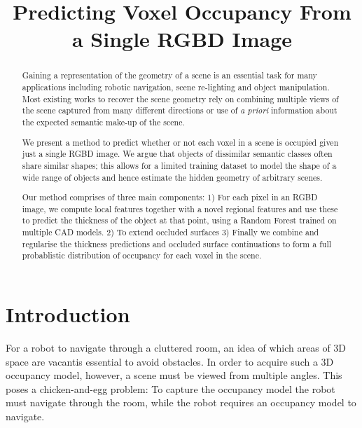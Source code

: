 \documentclass[10pt,twocolumn,letterpaper]{article}
\title{Predicting Voxel Occupancy From a Single RGBD Image}
\makeatletter
\renewcommand*{\eg}{e.g.\@\xspace}
\makeatother
\begin{document}
\maketitle

\begin{abstract}
	Gaining a representation of the geometry of a scene is an essential task for many applications including robotic navigation, scene re-lighting and object manipulation. 
	Most existing works to recover the scene geometry rely on combining multiple views of the scene captured from many different directions or use of \emph{a priori} information about the expected semantic make-up of the scene.

	We present a method to predict whether or not each voxel in a scene is occupied given just a single RGBD image.
	We argue that objects of dissimilar semantic classes often share similar shapes; this allows for a limited training dataset to model the shape of a wide range of objects and hence estimate the hidden geometry of arbitrary scenes.

	Our method comprises of three main components:
    1) For each pixel in an RGBD image, we compute local features together with a novel regional features and use these to predict the thickness of the object at that point, using a Random Forest trained on multiple CAD models.
    2) To extend occluded surfaces
    3) Finally we combine and regularise the thickness predictions and occluded surface continuations to form a full probablistic distribution of occupancy for each voxel in the scene.
\end{abstract}


\section{Introduction}

For a robot to navigate through a cluttered room, an idea of which areas of 3D space are vacantis essential to avoid obstacles.
In order to acquire such a 3D occupancy model, however, a scene must be viewed from multiple angles.
This poses a chicken-and-egg problem: To capture the occupancy model the robot must navigate through the room, while the robot requires an occupancy model to navigate.
\end{document}
